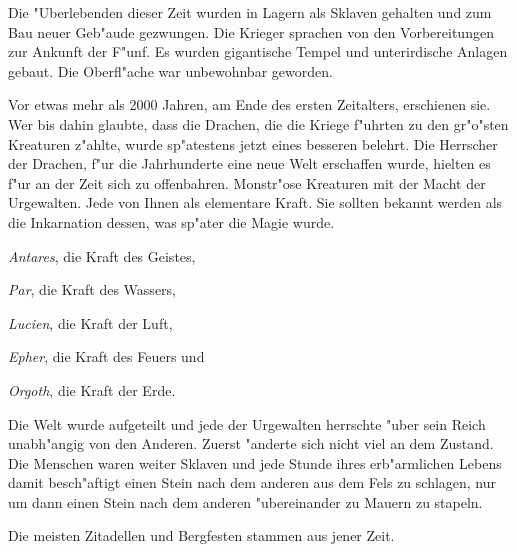 Die "Uberlebenden dieser Zeit wurden in Lagern als Sklaven gehalten und zum Bau neuer Geb"aude gezwungen. Die Krieger sprachen von den Vorbereitungen zur Ankunft der F"unf. Es wurden gigantische Tempel und unterirdische Anlagen gebaut. Die Oberfl"ache war unbewohnbar geworden.
\par Vor etwas mehr als 2000 Jahren, am Ende des ersten Zeitalters, erschienen sie. Wer bis dahin glaubte, dass die Drachen, die die Kriege f"uhrten zu den gr"o"sten Kreaturen z"ahlte, wurde sp"atestens jetzt eines besseren belehrt. Die Herrscher der Drachen, f"ur die Jahrhunderte eine neue Welt erschaffen wurde, hielten es f"ur an der Zeit sich zu offenbahren. Monstr"ose Kreaturen mit der Macht der Urgewalten. Jede von Ihnen als elementare Kraft. Sie sollten bekannt werden als die Inkarnation dessen, was sp"ater die Magie wurde.
\\
\par \textit{Antares}, die Kraft des Geistes,
\par \textit{Par}, die Kraft des Wassers,
\par \textit{Lucien}, die Kraft der Luft,
\par \textit{Epher}, die Kraft des Feuers und
\par \textit{Orgoth}, die Kraft der Erde.
\\
\par Die Welt wurde aufgeteilt und jede der Urgewalten herrschte "uber sein Reich unabh"angig von den Anderen. Zuerst "anderte sich nicht viel an dem Zustand. Die Menschen waren weiter Sklaven und jede Stunde ihres erb"armlichen Lebens damit besch"aftigt einen Stein nach dem anderen aus dem Fels zu schlagen, nur um dann einen Stein nach dem anderen "ubereinander zu Mauern zu stapeln.
\par Die meisten Zitadellen und Bergfesten stammen aus jener Zeit.
